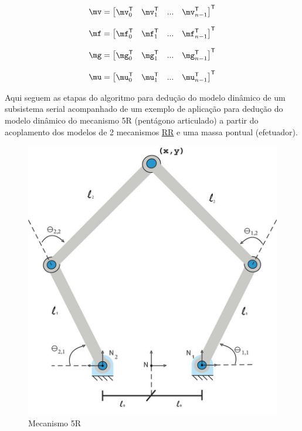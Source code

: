 \documentclass[a4paper,11pt,brazil,fleqn]{article}
\begin{document}
\begin{equation} \label{eq:Matrizv2}
\mv = \begin{bmatrix}
\mv_0^\msT & \mv_1^\msT & ... & \mv_{n-1}^\msT
\end{bmatrix}^\msT
\end{equation}

\begin{equation} \label{eq:Matrizf2}
\mf = \begin{bmatrix}
\mf_0^\msT & \mf_1^\msT & ... & \mf_{n-1}^\msT
\end{bmatrix}^\msT
\end{equation}

\begin{equation} \label{eq:Matrizg2}
\mg = \begin{bmatrix}
\mg_0^\msT & \mg_1^\msT & ... & \mg_{n-1}^\msT
\end{bmatrix}^\msT
\end{equation}

\begin{equation}
\mu =
\begin{bmatrix} \label{eq:Matrizu}
\mu_0^\msT & \mu_1^\msT & ... & \mu_{n-1}^\msT
\end{bmatrix}^\msT
\end{equation}

Aqui seguem as etapas do algoritmo para dedu\c{c}\~ao do modelo din\^amico de um subsistema serial acompanhado de um exemplo de aplica\c{c}\~ao para dedu\c{c}\~ao do modelo din\^amico do mecanismo 5R (pent\'agono articulado) a partir do acoplamento dos modelos de 2 mecanismos \underline{R}\underline{R} e uma massa pontual (efetuador).

\begin{figure}[H]
	\centering
	\includegraphics[scale=0.4]{5Rscan.jpg}
	\caption{Mecanismo 5R}
	\label{fig:RR}
\end{figure}
\end{document}
